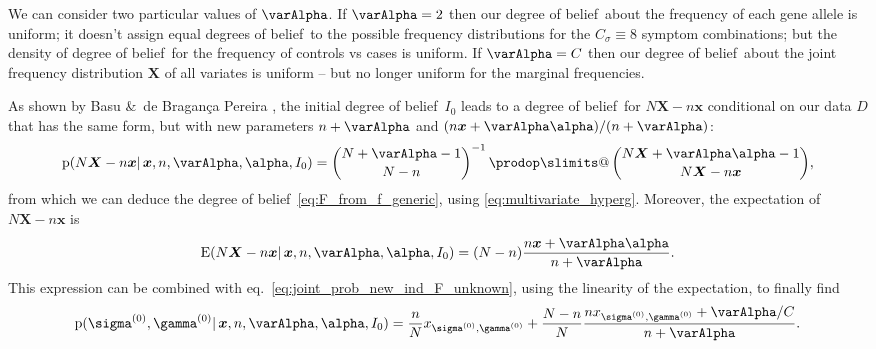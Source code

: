 \documentclass[\ifafour a4paper,12pt,\else a5paper,10pt,\fi%
onecolumn,oneside,article,%
british%
]{memoir}
\makeatletter
\theoremstyle{remark}
\theoremstyle{innote}
\def\sum{\DOTSI\sumop\slimits@}
\def\prod{\DOTSI\prodop\slimits@}
\newcommand*{\citey}{\parencites*}
\newcommand*{\amp}{\&}
\newcommand*{\delt}{\deltaup}%
\newcommand*{\di}{\mathrm{d}}%
\newcommand*{\pf}{\mathrm{p}}%
\renewcommand*{\|}{\mathpunct{|}}
\newcommand*{\sect}{\S}%
\newcommand*{\eqn}{eq.}%
\newcommand*{\tprod}{\mathop{\textstyle\prod}\nolimits}
\newcommand*{\tsum}{\mathop{\textstyle\sum}\nolimits}
\newcommand*{\E}{\mathrm{E}}
\newcommand*{\dob}{degree of belief}
\newcommand*{\dobs}{degrees of belief}
\newcommand*{\yD}{D}
\newcommand*{\ysum}{\tsum}
\newcommand*{\yprod}{\tprod}
\newcommand*{\ys}{\sigma}
\newcommand*{\yg}{\gamma}
\newcommand*{\ysi}[1]{\ys^{(#1)}}
\newcommand*{\ygi}[1]{\yg^{(#1)}}
\newcommand*{\yso}{\ysi{0}}
\newcommand*{\ygo}{\ygi{0}}
\newcommand*{\yFs}{\bm{S}}
\newcommand*{\yF}{\bm{X}}
\newcommand*{\yf}{\bm{x}}
\newcommand*{\yCs}{C_{\sigma}}
\newcommand*{\yIo}{I_{0}}
\newcommand*{\yA}{\varAlpha}
\newcommand*{\ya}{\bm{\alpha}}
\makeatother
\begin{document}
We can consider two particular values of $\yA$. If $\yA=2$ then our \dob\
about the frequency of each gene allele is uniform; it doesn't assign equal
\dobs\ to the possible frequency distributions for the $\yCs\equiv 8$
symptom combinations;%
but the density of \dob\ for the frequency of controls vs cases is uniform.
If $\yA=C$ then our \dob\ about the joint frequency distribution $\yF$ of
all variates is uniform -- but no longer uniform for the marginal
frequencies.


As shown by Basu \amp\ de Bragan\c{c}a Pereira \citey[\sect~4,
Theorem~2]{basuetal1982}, the initial \dob\ $\yIo$ leads to a \dob\ for
$N\yF-n\yf$ conditional on our data $\yD$ that has the same form, but with
new parameters $n+\yA$ and $(n\yf+\yA\ya)/(n+\yA)$:
\begin{equation}
  \label{eq:dirichlet_posterior_X}
  \pf(N\yF -n\yf \| \yf, n, \yA, \ya,\yIo) =
  \binom{N+\yA-1}{N-n}^{-1} \yprod\binom{N\yF+\yA\ya-1}{N\yF-n\yf},
\end{equation}
from which we can deduce the \dob~\eqref{eq:F_from_f_generic}, using
\eqref{eq:multivariate_hyperg}. Moreover, the expectation of $N\yF-n\yf$ is
\citey[\sect~3]{basuetal1982}
\begin{equation}
  \label{eq:dirichlet_posterior_expectation}
  \E(N\yF -n\yf \| \yf, n, \yA, \ya,\yIo) =
  (N-n) \frac{n\yf+\yA\ya}{n+\yA}.
\end{equation}
This expression can be combined with
\eqn~\eqref{eq:joint_prob_new_ind_F_unknown}, using the linearity of the
expectation, to finally find
\begin{equation}
    \label{eq:joint_prob_new_ind_full_dirichlet_prior_final}
    \pf(\yso, \ygo \| \yf, n,\yA,\ya, \yIo)  =
    \frac{n}{N}x_{\yso, \ygo} + \frac{N-n}{N}
\frac{n x_{\yso, \ygo}+\yA/C}{n+\yA}.
\end{equation}
\end{document}
